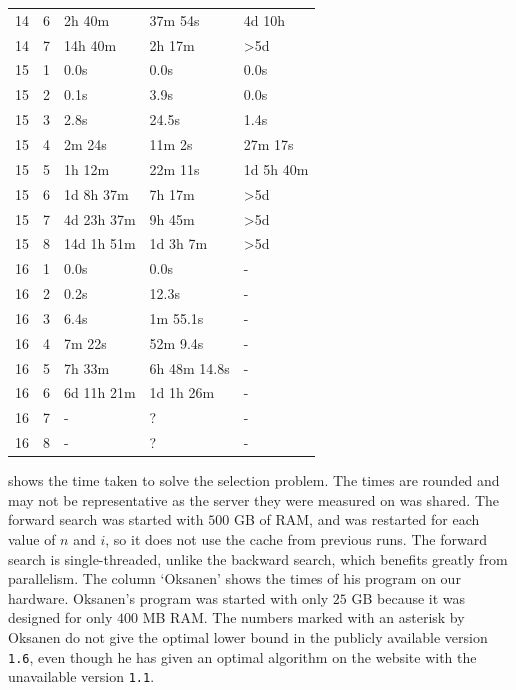 \documentclass[twoside,leqno,twocolumn]{article}
\begin{document}
\begin{table}[!t]
\begin{tabular}{c|c|l|l|l}
    14  & 6   & 2h 40m           & 37m 54s           & 4d 10h           \\
    14  & 7   & 14h 40m          & 2h 17m            & >5d              \\
    \hline
    15  & 1   & 0.0s             & 0.0s              & 0.0s             \\
    15  & 2   & 0.1s             & 3.9s              & 0.0s             \\
    15  & 3   & 2.8s             & 24.5s             & 1.4s             \\
    15  & 4   & 2m 24s           & 11m 2s            & 27m 17s          \\
    15  & 5   & 1h 12m           & 22m 11s           & 1d 5h 40m        \\
    15  & 6   & 1d 8h 37m        & 7h 17m            & >5d              \\
    15  & 7   & 4d 23h 37m       & 9h 45m            & >5d              \\
    15  & 8   & 14d 1h 51m       & 1d 3h 7m          & >5d              \\
    \hline
    16  & 1   & 0.0s             & 0.0s              & -                \\
    16  & 2   & 0.2s             & 12.3s             & -                \\
    16  & 3   & 6.4s             & 1m 55.1s          & -                \\
    16  & 4   & 7m 22s           & 52m 9.4s          & -                \\
    16  & 5   & 7h 33m           & 6h 48m 14.8s      & -                \\
    16  & 6   & 6d 11h 21m       & 1d 1h 26m         & -                \\
    16  & 7   & -                & ?                 & -                \\
    16  & 8   & -                & ?                 & -                \\
  \end{tabular}
\end{table}

 shows the time taken to solve the selection problem.
The times are rounded and may not be representative as the server they were measured on was shared.
The forward search was started with $500$ GB of RAM, and was restarted for each value of $n$ and $i$, so it does not use the cache from previous runs.
The forward search is single-threaded, unlike the backward search, which benefits greatly from parallelism.
The column `Oksanen' shows the times of his program \cite{Oksanen} on our hardware.
Oksanen's program was started with only $25$ GB because it was designed for only $400$ MB RAM.
The numbers marked with an asterisk by Oksanen do not give the optimal lower bound in the publicly available version \texttt{1.6}, even though he has given an optimal algorithm on the website with the unavailable version \texttt{1.1}.
\end{document}
